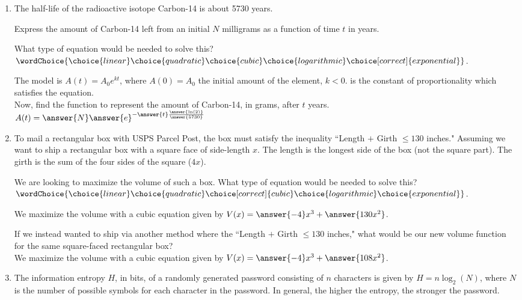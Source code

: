 \documentclass{ximera}
\begin{document}
\begin{exercise}
\begin{enumerate}
\item The half-life of the radioactive isotope Carbon-14 is about 5730 years.

Express the amount of Carbon-14 left from an initial $N$ milligrams
as a function of time $t$ in years.

What type of equation would be needed to solve this?\\
$\wordChoice{\choice{linear}\choice{quadratic}\choice{cubic}\choice{logarithmic}\choice[correct]{exponential}}$.
\begin{exercise}
The model is $A(t) = A_0e^{kt}$, where $A(0)=A_0$ the initial amount of the element, $k<0$. is the constant of proportionality which satisfies the equation. \\
Now, find the function to represent the amount of Carbon-14, in grams, after $t$ years. \\
$A(t) = \answer{N}\answer{e}^{-\answer{t} \frac{\answer{\ln(2)}}{\answer{5730}}}$
\end{exercise}



\item To mail a rectangular box with USPS Parcel Post, the box must satisfy the inequality ``Length $+$ Girth $\leq 130$ inches." Assuming we want to ship a rectangular box with a square face of side-length $x$. The length is the longest side of the box (not the square part). The girth is the sum of the four sides of the square ($4x$).

We are looking to maximize the volume of such a box. What type of equation would be needed to solve this?\\
$\wordChoice{\choice{linear}\choice{quadratic}\choice[correct]{cubic}\choice{logarithmic}\choice{exponential}}$.
%
\begin{exercise}
We maximize the volume with a cubic equation given by $V(x) = \answer{-4}x^3+\answer{130x^2}$.
\begin{exercise}
If we instead wanted to ship via another method where the ``Length $+$ Girth $\leq 130$ inches," what would be our new volume function for the same square-faced rectangular box?\\
We maximize the volume with a cubic equation given by $V(x) = \answer{-4}x^3+\answer{108x^2}$.
\end{exercise}
\end{exercise}

\item The information entropy $H$, in bits, of a randomly generated password consisting
of $n$ characters is given by $H = n\log_2(N)$, where $N$ is the number of possible symbols for each
character in the password. In general, the higher the entropy, the stronger the password.


\end{enumerate}
\end{exercise}
\end{document}
